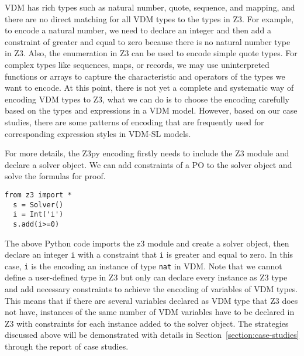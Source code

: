 VDM has rich types such as natural number, quote, sequence, and mapping, and there are no direct matching for all VDM types to the types in Z3. For example, to encode a natural number, we need to declare an integer and then add a constraint of greater and equal to zero because there is no natural number type in Z3. Also, the enumeration in Z3 can be used to encode simple quote types. For complex types like sequences, maps, or records, we may use uninterpreted functions or arrays to capture the characteristic and operators of the types we want to encode. At this point, there is not yet a complete and systematic way of encoding VDM types to Z3, what we can do is to choose the encoding carefully based on the types and expressions in a VDM model. However, based on our case studies, there are some patterns of encoding that are frequently used for corresponding expression styles in VDM-SL models.

For more details, the Z3py encoding firstly needs to include the Z3 module and declare a solver object. We can add constraints of a PO to the solver object and solve the formulas for proof.

\begin{mdframed}[roundcorner=5pt,shadow=true]
\begin{Verbatim}[fontsize=\small]
  from z3 import *
  s = Solver()
  i = Int('i')
  s.add(i>=0)
\end{Verbatim}
\end{mdframed}

The above Python code imports the z3 module and create a solver object, then declare an integer {\tt i} with a constraint that {\tt i} is greater and equal to zero. In this case, {\tt i} is the encoding an instance of type {\tt nat} in VDM. Note that we cannot define a user-defined type in Z3 but only can declare every instance as Z3 type and add necessary constraints to achieve the encoding of variables of VDM types. This means that if there are several variables declared as VDM type that Z3 does not have, instances of the same number of VDM variables have to be declared in Z3 with constraints for each instance added to the solver object. The strategies discussed above will be demonstrated with details in Section~\ref{section:case-studies} through the report of case studies.


